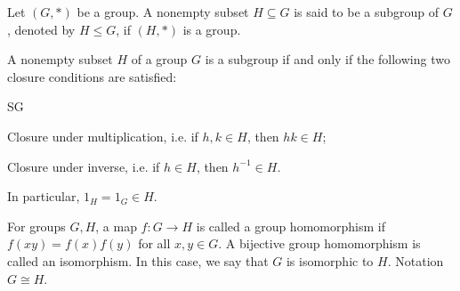 \begin{definition}[Subgroup]
    Let \((G, *)\) be a group. A nonempty subset \(H \subseteq G\) is said to be a subgroup of \(G\), denoted by \(H \leq G\), if \((H, *)\) is a group.
\end{definition}

\begin{lemma}
    A nonempty subset \(H\) of a group \(G\) is a subgroup if and only if the following two closure conditions are satisfied:
    \begin{statements}{SG}
        \item Closure under multiplication, i.e. if \(h, k \in H\), then \(hk \in H\);
        \item Closure under inverse, i.e. if \(h \in H\), then \(h^{-1} \in H\).
    \end{statements}
    In particular, \(1_H = 1_G \in H\).
\end{lemma}

\begin{definition}
    For groups \(G, H\), a map \(f : G \to H\) is called a group homomorphism if \(f(xy) = f(x)f(y)\) for all \(x, y \in G\). A bijective group homomorphism is called an isomorphism. In this case, we say that \(G\) is isomorphic to \(H\). Notation \(G \cong H\).
\end{definition}

\pagebreak